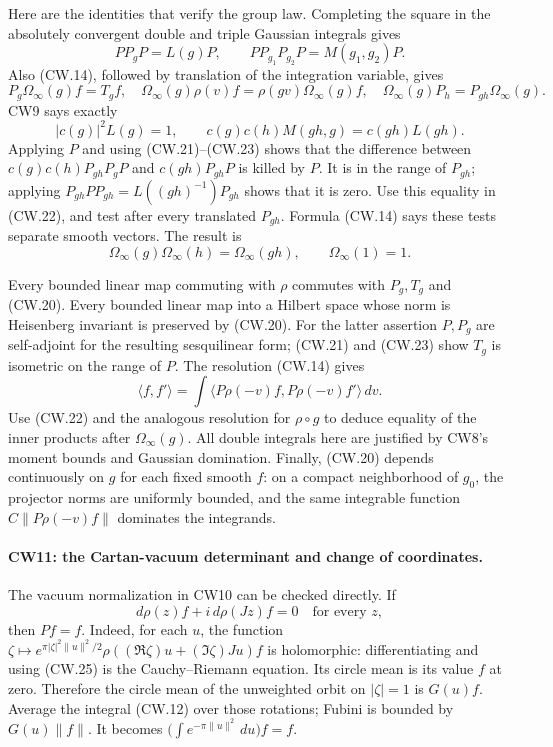 Here are the identities that verify the group law.  Completing
the square in the absolutely convergent double and triple
Gaussian integrals gives
\[
 PP_gP=L(g)P,\qquad
 PP_{g_1}P_{g_2}P=M(g_1,g_2)P.                         \tag{CW.21}
\]
Also (CW.14), followed by translation of the integration variable,
gives
\[
 P_g\Omega_\infty(g)f=T_gf,\quad
 \Omega_\infty(g)\rho(v)f=\rho(gv)\Omega_\infty(g)f,
 \quad \Omega_\infty(g)P_h=P_{gh}\Omega_\infty(g).       \tag{CW.22}
\]
CW9 says exactly
\[
 |c(g)|^2L(g)=1,\qquad
 c(g)c(h)M(gh,g)=c(gh)L(gh).                           \tag{CW.23}
\]
Applying $P$ and using (CW.21)--(CW.23) shows that the difference
between $c(g)c(h)P_{gh}P_gP$ and $c(gh)P_{gh}P$ is killed by $P$.
It is in the range of $P_{gh}$; applying
$P_{gh}PP_{gh}=L((gh)^{-1})P_{gh}$ shows that it is zero.
Use this equality in (CW.22), and test after every translated
$P_{gh}$.  Formula (CW.14) says these tests separate smooth vectors.
The result is
\[
 \Omega_\infty(g)\Omega_\infty(h)=\Omega_\infty(gh),
                   \qquad\Omega_\infty(1)=1.           \tag{CW.24}
\]

Every bounded linear map commuting with $\rho$ commutes with
$P_g,T_g$ and (CW.20).  Every bounded linear map into a Hilbert space
whose norm is Heisenberg invariant is preserved by (CW.20).
For the latter assertion $P,P_g$ are self-adjoint for the resulting
sesquilinear form; (CW.21) and (CW.23) show $T_g$ is isometric on
the range of $P$.  The resolution (CW.14) gives
\[
 \langle f,f'\rangle
   =\int\langle P\rho(-v)f,P\rho(-v)f'\rangle\,dv.
\]
Use (CW.22) and the analogous resolution for $\rho\circ g$ to
deduce equality of the inner products after $\Omega_\infty(g)$.
All double integrals here are justified by CW8's moment bounds
and Gaussian domination.  Finally, (CW.20) depends continuously
on $g$ for each fixed smooth $f$: on a compact neighborhood of
$g_0$, the projector norms are uniformly bounded, and the same
integrable function $C\|P\rho(-v)f\|$ dominates the integrands.

\paragraph{CW11: the Cartan-vacuum determinant and change of coordinates.}
The vacuum normalization in CW10 can be checked directly.  If
\[
 d\rho(z)f+i\,d\rho(Jz)f=0\quad\text{for every }z,
                                                               \tag{CW.25}
\]
then $Pf=f$.  Indeed, for each $u$, the function
$\zeta\mapsto e^{\pi|\zeta|^2\|u\|^2/2}
 \rho((\Re\zeta)u+(\Im\zeta)Ju)f$
is holomorphic: differentiating and using (CW.25) is the
Cauchy--Riemann equation.  Its circle mean is its value $f$ at
zero.  Therefore the circle mean of the unweighted orbit on
$|\zeta|=1$ is $G(u)f$.  Average the integral (CW.12) over those
rotations; Fubini is bounded by $G(u)\|f\|$.  It becomes
$\bigl(\int e^{-\pi\|u\|^2}\,du\bigr)f=f$.

